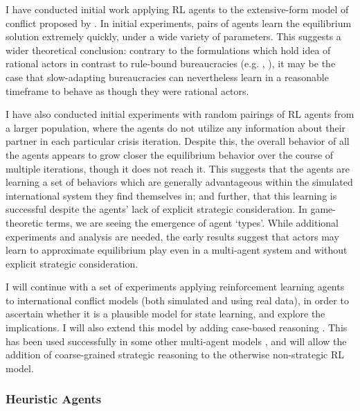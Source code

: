 I have conducted initial work applying RL agents to the extensive-form model of conflict proposed by \citet{signorino_1999}. In initial experiments, pairs of agents learn the equilibrium solution extremely quickly, under a wide variety of parameters. This suggests a wider theoretical conclusion: contrary to the formulations which hold idea of rational actors in contrast to rule-bound bureaucracies (e.g. \citet{allison_1999}, \citet{schrodt_2004}), it may be the case that slow-adapting bureaucracies can nevertheless learn in a reasonable timeframe to behave as though they were rational actors.

I have also conducted initial experiments with random pairings of RL agents from a larger population, where the agents do not utilize any information about their partner in each particular crisis iteration. Despite this, the overall behavior of all the agents appears to grow closer the equilibrium behavior over the course of multiple iterations, though it does not reach it. This suggests that the agents are learning a set of behaviors which are generally advantageous within the simulated international system they find themselves in; and further, that this learning is successful despite the agents' lack of explicit strategic consideration. In game-theoretic terms, we are seeing the emergence of agent `types'. While additional experiments and analysis are needed, the early results suggest that actors may learn to approximate equilibrium play even in a multi-agent system and without explicit strategic consideration.

I will continue with a set of experiments applying reinforcement learning agents to international conflict models (both simulated and using real data), in order to ascertain whether it is a plausible model for state learning, and explore the implications. I will also extend this model by adding case-based reasoning \citep{leake_1994}. This has been used successfully in some other multi-agent models \citep{izquierdo_2004}, and will allow the addition of coarse-grained strategic reasoning to the otherwise non-strategic RL model.

\subsubsection{Heuristic Agents}\label{heuristic-agents}

